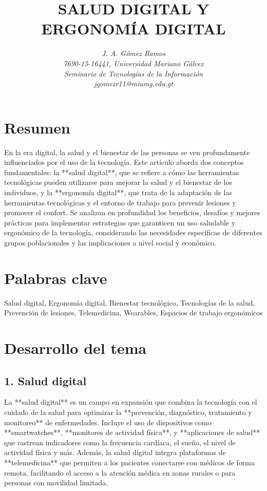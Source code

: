 \documentclass[12pt]{article}
\begin{document}
\title{\textbf{SALUD DIGITAL Y ERGONOMÍA DIGITAL}}
\author{\textit{J. A. Gómez Ramos}\\
\textit{7690-15-16441, Universidad Mariano Gálvez}\\
\textit{Seminario de Tecnologías de la Información}\\
\textit{jgomezr11@miumg.edu.gt}}
\date{}
\maketitle

\section*{Resumen}
En la era digital, la salud y el bienestar de las personas se ven profundamente influenciados por el uso de la tecnología. Este artículo aborda dos conceptos fundamentales: la **salud digital**, que se refiere a cómo las herramientas tecnológicas pueden utilizarse para mejorar la salud y el bienestar de los individuos, y la **ergonomía digital**, que trata de la adaptación de las herramientas tecnológicas y el entorno de trabajo para prevenir lesiones y promover el confort. Se analizan en profundidad los beneficios, desafíos y mejores prácticas para implementar estrategias que garanticen un uso saludable y ergonómico de la tecnología, considerando las necesidades específicas de diferentes grupos poblacionales y las implicaciones a nivel social y económico.

\section*{Palabras clave}
Salud digital, Ergonomía digital, Bienestar tecnológico, Tecnologías de la salud, Prevención de lesiones, Telemedicina, Wearables, Espacios de trabajo ergonómicos

\section{Desarrollo del tema}

\subsection{1. Salud digital}
La **salud digital** es un campo en expansión que combina la tecnología con el cuidado de la salud para optimizar la **prevención, diagnóstico, tratamiento y monitoreo** de enfermedades. Incluye el uso de dispositivos como **smartwatches**, **monitores de actividad física**, y **aplicaciones de salud** que rastrean indicadores como la frecuencia cardíaca, el sueño, el nivel de actividad física y más. Además, la salud digital integra plataformas de **telemedicina** que permiten a los pacientes conectarse con médicos de forma remota, facilitando el acceso a la atención médica en zonas rurales o para personas con movilidad limitada.
\end{document}
